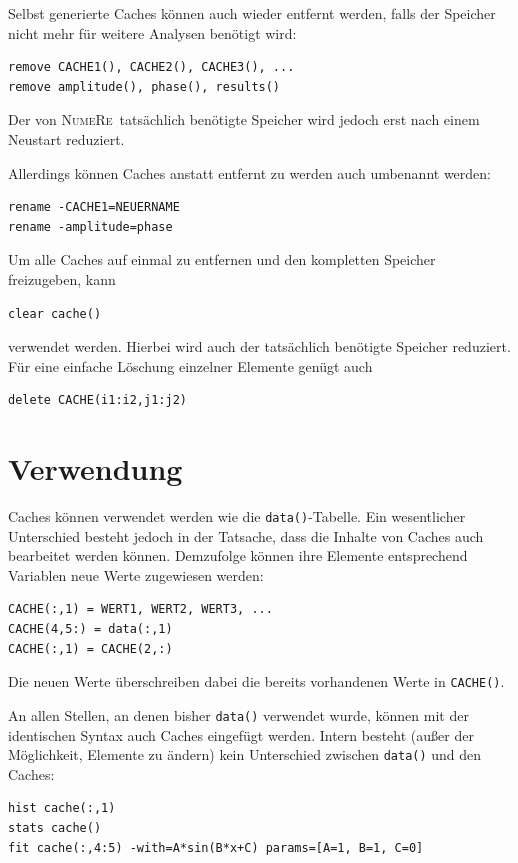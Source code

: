 \documentclass[DIV=14,headsepline,footsepline]{scrbook}
\newcommand{\NR}{\textsc{Nu\-me\-Re}}
\begin{document}
				Selbst generierte Caches können auch wieder entfernt werden, falls der Speicher nicht mehr für weitere Analysen benötigt wird:
				\begin{lstlisting}
remove CACHE1(), CACHE2(), CACHE3(), ...
remove amplitude(), phase(), results()
				\end{lstlisting}
				Der von \NR\ tatsächlich benötigte Speicher wird jedoch erst nach einem Neustart reduziert.
				
				Allerdings können Caches anstatt entfernt zu werden auch umbenannt werden:
				\begin{lstlisting}
rename -CACHE1=NEUERNAME
rename -amplitude=phase
				\end{lstlisting}
				
				Um alle Caches auf einmal zu entfernen und den kompletten Speicher freizugeben, kann 
				\begin{lstlisting}
clear cache()
				\end{lstlisting}
				verwendet werden. Hierbei wird auch der tatsächlich benötigte Speicher reduziert. Für eine einfache Löschung einzelner Elemente genügt auch 
				\begin{lstlisting}
delete CACHE(i1:i2,j1:j2)
				\end{lstlisting}
				
			\section{Verwendung}
				Caches können verwendet werden wie die \verb+data()+-Tabelle. Ein wesentlicher Unterschied besteht jedoch in der Tatsache, dass die Inhalte von Caches auch bearbeitet werden können. Demzufolge können ihre Elemente entsprechend Variablen neue Werte zugewiesen werden:
				\begin{lstlisting}
CACHE(:,1) = WERT1, WERT2, WERT3, ...
CACHE(4,5:) = data(:,1)
CACHE(:,1) = CACHE(2,:)
				\end{lstlisting}
				Die neuen Werte überschreiben dabei die bereits vorhandenen Werte in \verb+CACHE()+.
				
				An allen Stellen, an denen bisher \verb+data()+ verwendet wurde, können mit der identischen Syntax auch Caches eingefügt werden. Intern besteht (außer der Möglichkeit, Elemente zu ändern) kein Unterschied zwischen \verb+data()+ und den Caches:
				\begin{lstlisting}
hist cache(:,1)
stats cache()
fit cache(:,4:5) -with=A*sin(B*x+C) params=[A=1, B=1, C=0]
				\end{lstlisting}
				
\end{document}

